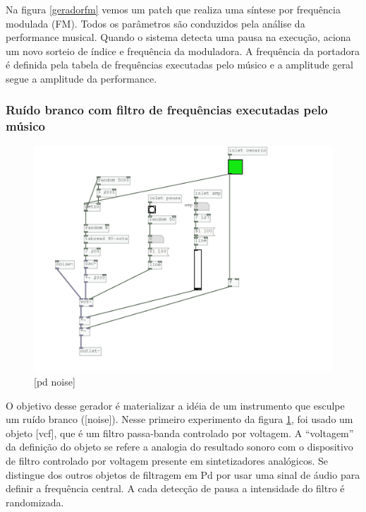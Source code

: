 \documentclass{ppgmus}
\begin{document}
Na figura \ref{geradorfm} vemos um patch que realiza 
uma síntese por frequência modulada (FM). Todos os parâmetros
são conduzidos pela análise da performance musical.
Quando o sistema detecta uma pausa na execução, aciona um novo
sorteio de índice e frequência da moduladora.
A frequência da portadora é definida pela tabela de frequências
executadas pelo músico e a amplitude geral segue a amplitude
da performance.


\subsubsection{Ruído branco com filtro de frequências executadas pelo músico}

\begin{figure}
\includegraphics[scale=.6]{gerador-sintese-noise}
\caption{[pd noise]}
\label{geradornoise}
\end{figure}

O objetivo desse gerador é materializar a idéia de um
instrumento que esculpe um ruído branco ([noise\texttildelow]).
Nesse primeiro experimento da figura \ref{geradornoise}, foi usado 
um objeto [vcf\texttildelow], que é um filtro passa-banda controlado
por voltagem. A ``voltagem'' da definição do objeto se refere a analogia
do resultado sonoro com  o dispositivo de filtro controlado por voltagem
presente em sintetizadores analógicos. Se distingue dos outros objetos
de filtragem em Pd por usar uma sinal de áudio para definir a frequência
central. A cada detecção de pausa a intensidade do filtro é randomizada.
\end{document}
